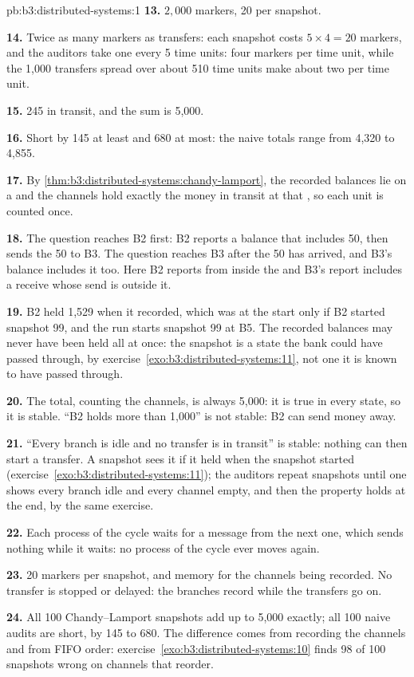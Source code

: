 \begin{solution}{pb:b3:distributed-systems:1}
\textbf{13.} $2{,}000$ markers, 20 per snapshot.

\textbf{14.} Twice as many markers as transfers: each snapshot costs $5 \times 4 = 20$ markers, and the auditors take one every 5 time units: four markers per time unit, while the 1,000 transfers spread over about 510 time units make about two per time unit.

\textbf{15.} 245 in transit, and the sum is 5,000.

\textbf{16.} Short by 145 at least and 680 at most: the naive totals range from 4,320 to 4,855.

\textbf{17.} By \cref{thm:b3:distributed-systems:chandy-lamport}, the recorded balances lie on a  and the channels hold exactly the money in transit at that , so each unit is counted once.

\textbf{18.} The question reaches B2 first: B2 reports a balance that includes 50, then sends the 50 to B3. The question reaches B3 after the 50 has arrived, and B3's balance includes it too. Here B2 reports from inside the  and B3's report includes a receive whose send is outside it.

\textbf{19.} B2 held 1,529 when it recorded, which was at the start only if B2 started snapshot 99, and the run starts snapshot 99 at B5. The recorded balances may never have been held all at once: the snapshot is a state the bank could have passed through, by exercise~\ref{exo:b3:distributed-systems:11}, not one it is known to have passed through.

\textbf{20.} The total, counting the channels, is always 5,000: it is true in every state, so it is stable. ``B2 holds more than 1,000'' is not stable: B2 can send money away.

\textbf{21.} ``Every branch is idle and no transfer is in transit'' is stable: nothing can then start a transfer. A snapshot sees it if it held when the snapshot started (exercise~\ref{exo:b3:distributed-systems:11}); the auditors repeat snapshots until one shows every branch idle and every channel empty, and then the property holds at the end, by the same exercise.

\textbf{22.} Each process of the cycle waits for a message from the next one, which sends nothing while it waits: no process of the cycle ever moves again.

\textbf{23.} 20 markers per snapshot, and memory for the channels being recorded. No transfer is stopped or delayed: the branches record while the transfers go on.

\textbf{24.} All 100 Chandy--Lamport snapshots add up to 5,000 exactly; all 100 naive audits are short, by 145 to 680. The difference comes from recording the channels and from FIFO order: exercise~\ref{exo:b3:distributed-systems:10} finds 98 of 100 snapshots wrong on channels that reorder.
\end{solution}
